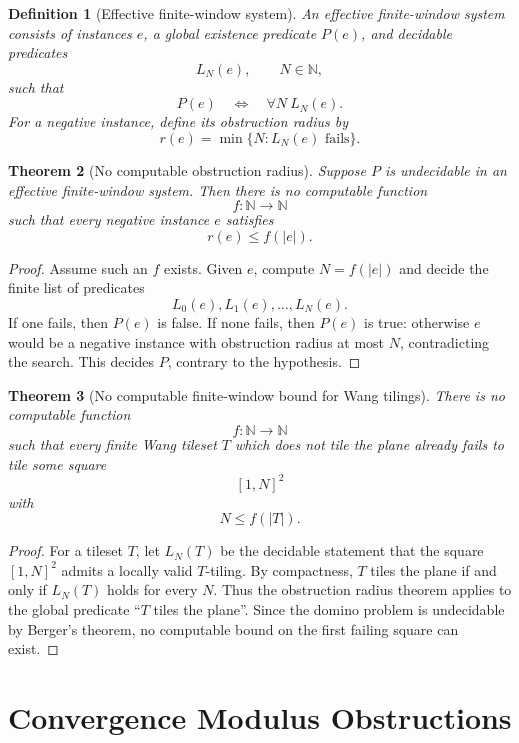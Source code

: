 \documentclass[11pt]{article}
\newtheorem{theorem}{Theorem}[section]
\newtheorem{definition}[theorem]{Definition}
\begin{document}
\begin{definition}[Effective finite-window system]
An effective finite-window system consists of instances \(e\), a global existence predicate \(P(e)\), and decidable predicates
\[
L_N(e),\qquad N\in\mathbb N,
\]
such that
\[
P(e)\quad\Longleftrightarrow\quad \forall N\ L_N(e).
\]
For a negative instance, define its obstruction radius by
\[
r(e)=\min\{N:L_N(e)\text{ fails}\}.
\]
\end{definition}

\begin{theorem}[No computable obstruction radius]
Suppose \(P\) is undecidable in an effective finite-window system. Then there is no computable function
\[
f:\mathbb N\to\mathbb N
\]
such that every negative instance \(e\) satisfies
\[
r(e)\leq f(|e|).
\]
\end{theorem}

\begin{proof}
Assume such an \(f\) exists. Given \(e\), compute \(N=f(|e|)\) and decide the finite list of predicates
\[
L_0(e),L_1(e),\ldots,L_N(e).
\]
If one fails, then \(P(e)\) is false. If none fails, then \(P(e)\) is true: otherwise \(e\) would be a negative instance with obstruction radius at most \(N\), contradicting the search. This decides \(P\), contrary to the hypothesis.
\end{proof}

\begin{theorem}[No computable finite-window bound for Wang tilings]
There is no computable function
\[
f:\mathbb N\to\mathbb N
\]
such that every finite Wang tileset \(T\) which does not tile the plane already fails to tile some square
\[
[1,N]^2
\]
with
\[
N\leq f(|T|).
\]
\end{theorem}

\begin{proof}
For a tileset \(T\), let \(L_N(T)\) be the decidable statement that the square \([1,N]^2\) admits a locally valid \(T\)-tiling. By compactness, \(T\) tiles the plane if and only if \(L_N(T)\) holds for every \(N\). Thus the obstruction radius theorem applies to the global predicate ``\(T\) tiles the plane''. Since the domino problem is undecidable by Berger's theorem, no computable bound on the first failing square can exist.
\end{proof}

\section{Convergence Modulus Obstructions}
\end{document}

